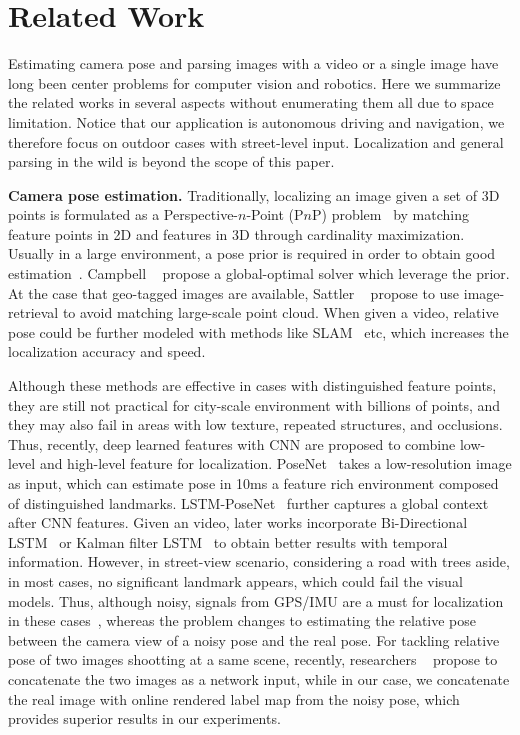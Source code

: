 \vspace{-0.6\baselineskip}
\section{Related Work}
\vspace{-0.5\baselineskip}
\label{sec:related_work}
Estimating camera pose and parsing images with a video or a single image have long been center problems for computer vision and robotics.
Here we summarize the related works in several aspects without enumerating them all due to space limitation.
Notice that our application is autonomous driving and navigation, we therefore focus on outdoor cases with street-level input. Localization and general parsing in the wild is beyond the scope of this paper.

\textbf{Camera pose estimation.} Traditionally, localizing an image given a set of 3D points is formulated as a Perspective-$n$-Point (P$n$P) problem~\cite{haralick1994review,kneip2014upnp} by matching feature points in 2D and features in 3D through cardinality maximization. Usually in a large environment, a pose prior is required in order to obtain good estimation~\cite{david2004softposit,moreno2008pose}. Campbell \etal~\cite{campbell2017globally} propose a global-optimal solver which leverage the prior. At the case that geo-tagged images are available, Sattler \etal~\cite{sattler2017large} propose to use image-retrieval to avoid matching large-scale point cloud.
When given a video, relative pose could be further modeled with methods like SLAM~\cite{engel2014lsd} etc, which increases the localization accuracy and speed.

Although these methods are effective in cases with distinguished feature points, they are still not practical for city-scale environment with billions of points, and they may also fail in areas with low texture, repeated structures, and occlusions.
Thus, recently, deep learned features with CNN are proposed to combine low-level and high-level feature for localization. PoseNet~\cite{Kendall_2015_ICCV,kendall2017geometric} takes a low-resolution image as input, which can estimate pose in 10ms \wrt a feature rich environment composed of distinguished landmarks. LSTM-PoseNet~\cite{hazirbasimage} further captures a global context after CNN features.
Given an video, later works incorporate Bi-Directional LSTM~\cite{DBLP:journals/corr/ClarkWMTW17} or Kalman filter LSTM~\cite{coskun2017long} to obtain better results with temporal information. However, in street-view scenario, considering a road with trees aside, in most cases, no significant landmark appears, which could fail the visual models. Thus, although noisy, signals from GPS/IMU are a must for localization in these cases~\cite{vishal2015accurate}, whereas the problem changes to estimating the relative pose between the camera view of a noisy pose and the real pose. For tackling relative pose of two images shootting at a same scene, recently, researchers ~\cite{laskar2017camera,ummenhofer2016demon} propose to concatenate the two images as a network input, while in our case, we concatenate the real image with online rendered label map from the noisy pose, which provides superior results in our experiments.

